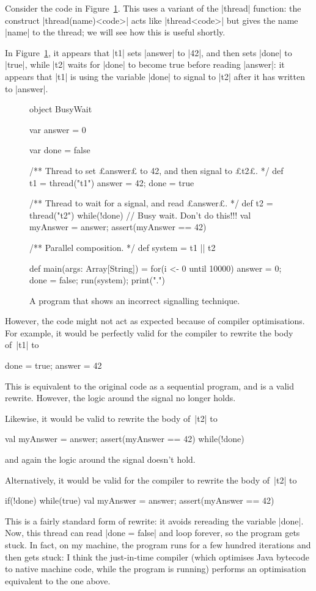 Consider the code in Figure~\ref{fig:busyWait}.  This uses a variant of the
|thread| function: the construct |thread(name){<code>}| acts like
|thread{<code>}|  but gives the name |name| to the thread; we will see how
this is useful shortly.

In Figure~\ref{fig:busyWait}, it appears that |t1| sets |answer| to |42|, and
then sets |done| to |true|, while |t2| waits for |done| to become true before
reading |answer|: it appears that |t1| is using the variable |done| to signal
to |t2| after it has written to |answer|.

\begin{figure}
\begin{scala}
object BusyWait{
  var answer = 0

  var done = false

  /** Thread to set £answer£ to 42, and then signal to £t2£. */
  def t1 = thread("t1"){ answer = 42; done = true }

  /** Thread to wait for a signal, and read £answer£. */
  def t2 = thread("t2"){
    while(!done){ } // Busy wait.  Don't do this!!!
    val myAnswer = answer; assert(myAnswer == 42)
  }

  /** Parallel composition. */
  def system = t1 || t2

  def main(args: Array[String]) = { 
    for(i <- 0 until 10000){ answer = 0; done = false; run(system); print(".") }
  }
}
\end{scala}
\caption{A program that shows an incorrect signalling technique.}
\label{fig:busyWait}
\end{figure}

However, the code might not act as expected because of compiler
optimisations.  For example, it would be perfectly valid for the compiler to
rewrite the body of~|t1| to
\begin{scala}
  done = true; answer = 42
\end{scala}
%
This is equivalent to the original code as a sequential program, and is a
valid rewrite.  However, the logic around the signal no longer holds.

Likewise, it would be valid to rewrite the body of~|t2| to
\begin{scala}
  val myAnswer = answer; assert(myAnswer == 42)
  while(!done){ } 
\end{scala}
and again the logic around the signal doesn't hold.  

Alternatively, it would
be valid for the compiler to rewrite the body of~|t2| to
% 
\begin{scala}
  if(!done){ while(true){ } }
  val myAnswer = answer; assert(myAnswer == 42)
\end{scala}
This is a fairly standard form of rewrite: it avoids rereading the variable
|done|.  Now, this thread can read |done = false| and loop forever, so the
program gets stuck.  In fact, on my machine, the program runs for a few
hundred iterations and then gets stuck: I think the just-in-time compiler
(which optimises Java bytecode to native machine code, while the program is
running) performs an optimisation equivalent to the one above.

